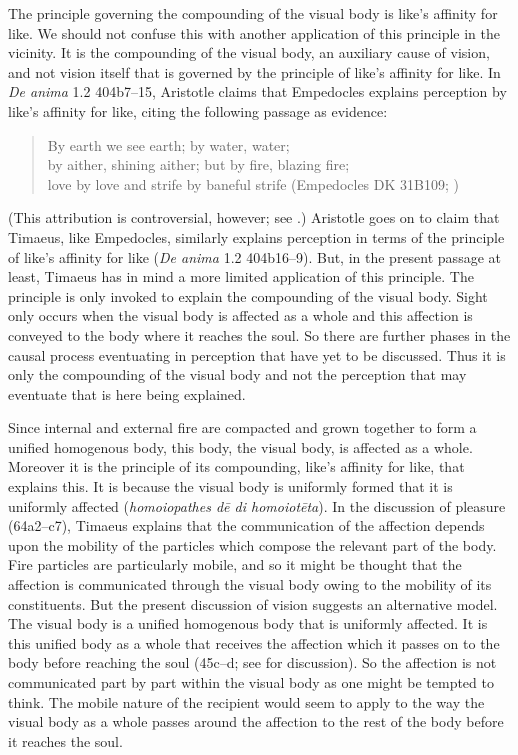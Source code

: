 The principle governing the compounding of the visual body is like's affinity for like. We should not confuse this with another application of this principle in the vicinity. It is the compounding of the visual body, an auxiliary cause of vision, and not vision itself that is governed by the principle of like's affinity for like. In \emph{De anima} 1.2 404b7--15, Aristotle claims that Empedocles explains perception by like's affinity for like, citing the following passage as evidence:
\begin{verse}
	By earth we see earth; by water, water;\\
	by aither, shining aither; but by fire, blazing fire;\\
	love by love and strife by baneful strife (Empedocles DK 31B109; \citealt[221]{Inwood:2001ve})
\end{verse} 
(This attribution is controversial, however; see \citealt{Kamtekar:2009fk}.) Aristotle goes on to claim that Timaeus, like Empedocles, similarly explains perception in terms of the principle of like's affinity for like (\emph{De anima} 1.2 404b16--9). But, in the present passage at least, Timaeus has in mind a more limited application of this principle. The principle is only invoked to explain the compounding of the visual body. Sight only occurs when the visual body is affected as a whole and this affection is conveyed to the body where it reaches the soul. So there are further phases in the causal process eventuating in perception that have yet to be discussed. Thus it is only the compounding of the visual body and not the perception that may eventuate that is here being explained.

Since internal and external fire are compacted and grown together to form a unified homogenous body, this body, the visual body, is affected as a whole. Moreover it is the principle of its compounding, like's affinity for like, that explains this. It is because the visual body is uniformly formed that it is uniformly affected (\emph{homoiopathes dē di homoiotēta}). In the discussion of pleasure (64a2--c7), Timaeus explains that the communication of the affection depends upon the mobility of the particles which compose the relevant part of the body. Fire particles are particularly mobile, and so it might be thought that the affection is communicated through the visual body owing to the mobility of its constituents. But the present discussion of vision suggests an alternative model. The visual body is a unified homogenous body that is uniformly affected. It is this unified body as a whole that receives the affection which it passes on to the body before reaching the soul (45c--d; see \citealt[72, 92 n46]{Hahm:1978ny} for discussion). So the affection is not communicated part by part within the visual body as one might be tempted to think. The mobile nature of the recipient would seem to apply to the way the visual body as a whole passes around the affection to the rest of the body before it reaches the soul.

